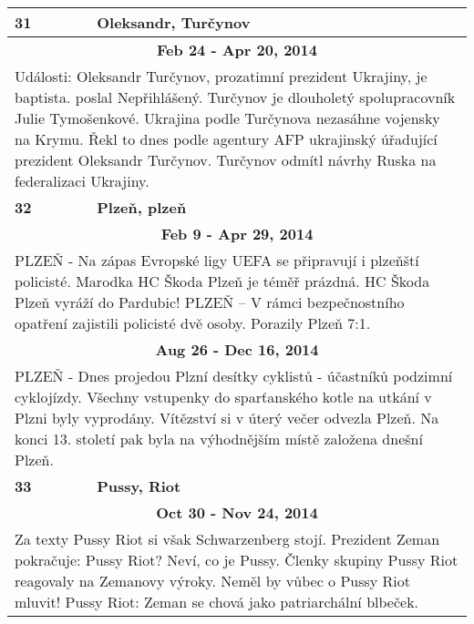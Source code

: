 \begin{tabularx}{\linewidth}{l l}
\bf 31 & \bf Oleksandr, Turčynov \\ \midrule
\multicolumn{2}{c}{\bf Feb 24 - Apr 20, 2014} \\
\multicolumn{2}{p{\linewidth}}{Události: Oleksandr Turčynov, prozatimní prezident Ukrajiny, je baptista. poslal Nepřihlášený. Turčynov je dlouholetý spolupracovník Julie Tymošenkové. Ukrajina podle Turčynova nezasáhne vojensky na Krymu. Řekl to dnes podle agentury AFP ukrajinský úřadující prezident Oleksandr Turčynov. Turčynov odmítl návrhy Ruska na federalizaci Ukrajiny.} \\ \midrule[1.5pt]

\bf 32 & \bf Plzeň, plzeň \\ \midrule
\multicolumn{2}{c}{\bf Feb 9 - Apr 29, 2014} \\
\multicolumn{2}{p{\linewidth}}{PLZEŇ - Na zápas Evropské ligy UEFA se připravují i plzeňští policisté. Marodka HC Škoda Plzeň je téměř prázdná. HC Škoda Plzeň vyráží do Pardubic! PLZEŇ – V rámci bezpečnostního opatření zajistili policisté dvě osoby. Porazily Plzeň 7:1.} \\ \midrule
\multicolumn{2}{c}{\bf Aug 26 - Dec 16, 2014} \\
\multicolumn{2}{p{\linewidth}}{PLZEŇ - Dnes projedou Plzní desítky cyklistů - účastníků podzimní cyklojízdy. Všechny vstupenky do sparťanského kotle na utkání v Plzni byly vyprodány. Vítězství si v úterý večer odvezla Plzeň. Na konci 13. století pak byla na výhodnějším místě založena dnešní Plzeň.} \\ \midrule[1.5pt]

\bf 33 & \bf Pussy, Riot \\ \midrule
\multicolumn{2}{c}{\bf Oct 30 - Nov 24, 2014} \\
\multicolumn{2}{p{\linewidth}}{Za texty Pussy Riot si však Schwarzenberg stojí. Prezident Zeman pokračuje: Pussy Riot? Neví, co je Pussy. Členky skupiny Pussy Riot reagovaly na Zemanovy výroky. Neměl by vůbec o Pussy Riot mluvit! Pussy Riot: Zeman se chová jako patriarchální blbeček.} \\ \midrule[1.5pt]


\end{tabularx}

